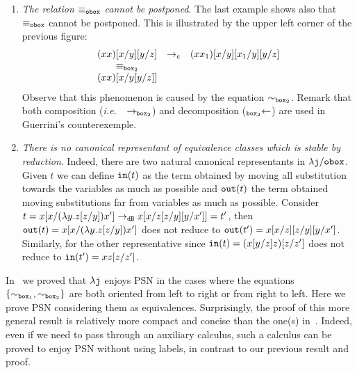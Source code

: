 \documentclass{LMCS}
\newcommand{\ie}{{\it  i.e.}~}
\renewcommand{\>}{\rightarrow}
\def\lam{\lambda}
\newcommand{\Rew}[1]{\rightarrow_{#1}}
\newcommand{\B}{{\tt dB}}
\newcommand{\dis}{{\tt j}}
\newcommand{\ldis}{\lam{\dis}}
\newcommand{\LRew}[1]{\mbox{}_{#1}{\leftarrow} }
\newcommand{\DSubs}{{\tt c}}
\newcommand{\Gc}{{\tt w}}
\newcommand{\set}[1]{ \{ #1 \}}
\newcommand{\modulo}[2]{#1/#2}
\newcommand{\nGc}{{\neg\Gc}}
\newcommand{\ignore}[1]{}
\newcommand{\eqw}[1]{\equiv_{#1}}
\newcommand{\eqo}{\equiv_\osym}
\newcommand{\preeq}{\sim}
\newcommand{\preeqw}[1]{\sim_{#1}}
\newcommand{\osym}{{\tt o}}
\newcommand{\preeqsigu}{\preeq_{\sigma_1}}
\newcommand{\ldiso}{\ldis/{\osym}}
\newcommand{\ldisf}{\lam \modulo{\dis}{\fsymb}}
\newcommand{\fsymb}{\osymb\boite}
\newcommand{\osymb}{{\tt o}}
\newcommand{\eqf}{\eqw{\fsymb}}
\newcommand{\boite}{{\tt box}}
\newcommand{\sigt}{\boite_1}
\newcommand{\sigq}{\boite_2}
\begin{document}
\begin{enumerate}[$\bullet$]
\item \textit{The relation $\eqf$ cannot be postponed}. The last
  example shows also that $\eqf$ cannot be postponed. 
This is illustrated by the upper left corner of
the previous figure:
\[ \begin{array}{cccccccccc}
(x x)[x/y][y/z]& \Rew{\DSubs}&(x x_1)[x/y][x_1/y][y/z]\\
\eqw{\sigq}\\
(x x)[x/y[y/z]]
   \end{array} \]
Observe that this phenomenon is caused by
the equation $\sim_{\sigq}$. Remark that both
composition (\ie\ $\Rew{\sigq}$) and decomposition 
($\LRew{\sigq}$) are used in Guerrini's
counterexemple. 
\ignore{Surprisingly, from our study we learned that dealing
with decomposition is more complicate than dealing with composition. 
\item \textit{Erasures cannot be postponed}.  Consider 
\[ \begin{array}{lllllllll}
\lam x. (y [y/y'[z/x]])&\Rew{\Gc}& \lam x. (y [y/y'])&\preeqsigu&(\lam x. y )[y/y'] 
   \end{array} \]
the two steps cannot be permuted. This is a phenomenon
concerning $\ldiso$ too, except that $\eqo$ can be postponed
with respect to $\ldis$ (Lemma~\ref{l:eqo-bisim}),
and then $\Rew{\Gc}$ can be postponed
with respect to $\Rew{\nGc}$. Unfortunately, $\eqf$ cannot be delayed in $\ldisf$ and so 
neither $\Rew{\Gc}$ can.
}
\item \label{it:in-out-instability}\textit{There is no canonical representant of equivalence
  classes which is stable by reduction}. Indeed, there are two natural
  canonical representants in $\ldisf$. Given $t$ we can define ${\tt
    in}(t)$ as the term obtained by moving all substitution towards
  the variables as much as possible and ${\tt
    out}(t)$ the term obtained moving substitutions far from variables
  as much as possible. Consider 
$t=x[x/(\lam y. z[z/y]) x'] \Rew{\B} x[x/ z[z/y][y/ x']]=t'$,
then 
${\tt out}(t) = x[x/(\lam y. z[z/y]) x']$
does not reduce to ${\tt out}(t')= x[x/ z][z/y][y/ x']$.
Similarly, for the other representative
since ${\tt in}(t)=(x[y/z] z)[z/z']$
does not reduce to ${\tt in}(t')=x z[z/z']$.\medskip
\end{enumerate}


\noindent In~\cite{AK10} we proved that $\ldis$ enjoys PSN in the cases where
the equations $\set{\preeqw{\sigt}, \preeqw{\sigq}}$ are both oriented from left to
right or from right to left. Here we prove PSN considering them as
equivalences. Surprisingly, the proof of this more
  general result is relatively more compact
  and concise than the one(s) in~\cite{AK10}. Indeed, even if we need
  to pass through an auxiliary calculus, such a calculus can be proved
  to enjoy PSN without using labels, in contrast to our previous
  result and proof. \medskip
\end{document}
